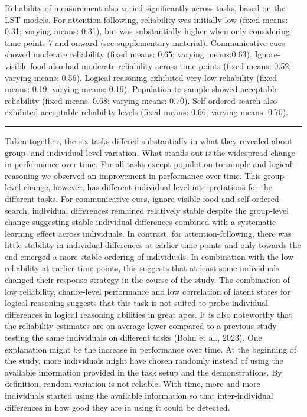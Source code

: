 \documentclass[
  man,floatsintext]{apa6}
\begin{document}
Reliability of measurement also varied significantly across tasks, based on the LST models. For attention-following, reliability was initially low (fixed means: 0.31; varying means: 0.31), but was substantially higher when only considering time points 7 and onward (see supplementary material). Communicative-cues showed moderate reliability (fixed means: 0.65; varying means:0.63). Ignore-visible-food also had moderate reliability across time points (fixed means: 0.52; varying means: 0.56). Logical-reasoning exhibited very low reliability (fixed means: 0.19; varying means: 0.19). Population-to-sample showed acceptable reliability (fixed means: 0.68; varying means: 0.70). Self-ordered-search also exhibited acceptable reliability levels (fixed means: 0.66; varying means: 0.70).

\begin{center}\rule{0.5\linewidth}{0.5pt}\end{center}

Taken together, the six tasks differed substantially in what they revealed about group- and individual-level variation. What stands out is the widespread change in performance over time. For all tasks except population-to-sample and logical-reasoning we observed an improvement in performance over time. This group-level change, however, has different individual-level interpretations for the different tasks. For communicative-cues, ignore-visible-food and self-ordered-search, individual differences remained relatively stable despite the group-level change suggesting stable individual differences combined with a systematic learning effect across individuals. In contrast, for attention-following, there was little stability in individual differences at earlier time points and only towards the end emerged a more stable ordering of individuals. In combination with the low reliability at earlier time points, this suggests that at least some individuals changed their response strategy in the course of the study. The combination of low reliability, chance-level performance and low correlation of latent states for logical-reasoning suggests that this task is not suited to probe individual differences in logical reasoning abilities in great apes. It is also noteworthy that the reliability estimates are on average lower compared to a previous study testing the same individuals on different tasks (Bohn et al., 2023). One explanation might be the increase in performance over time. At the beginning of the study, more individuals might have chosen randomly instead of using the available information provided in the task setup and the demonstrations. By definition, random variation is not reliable. With time, more and more individuals started using the available information so that inter-individual differences in how good they are in using it could be detected.
\end{document}
